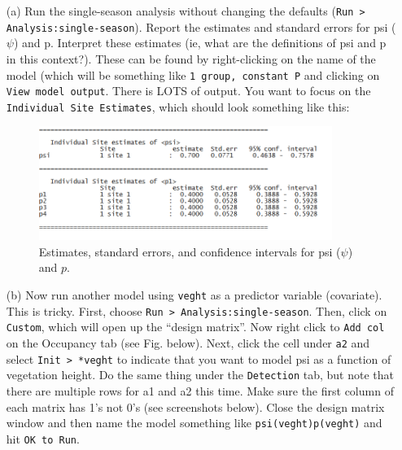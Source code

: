 \documentclass[12pt]{article}\usepackage[]{graphicx}\usepackage[]{color}
\begin{document}
\begin{enumerate}
  \item[(a)] Run the single-season analysis without changing the
    defaults (\texttt{Run > Analysis:single-season}). Report the
    estimates and standard errors for psi ($\psi$) and p. Interpret
    these estimates (ie, what are the definitions of psi and p in this
    context?). These can be found by right-clicking on the name of the
    model (which will be something like \texttt{1 group, constant P}
    and clicking on \texttt{View model output}.  There is LOTS of
    output. You want to focus on the \texttt{Individual Site
      Estimates}, which should look something like this: 

\begin{figure}[h!]
  \centering
  \includegraphics[width=0.9\textwidth]{figs/pres-est}
  \caption{\small Estimates, standard errors, and confidence intervals
  for psi ($\psi$) and $p$.}
  \label{fig:pres-est}
\end{figure}
    
  \item[(b)] Now run another model using \texttt{veght} as a
    predictor variable (covariate). This is tricky. First, choose 
    \texttt{Run > Analysis:single-season}. Then, click on
    \texttt{Custom}, which will open up the ``design matrix''. Now
    right click to \texttt{Add col} on the Occupancy tab (see
    Fig. below). Next, click the cell under \texttt{a2} and select 
    \texttt{Init > *veght} to indicate that you want to model psi
    as a function of vegetation height. Do the same thing under the
    \texttt{Detection} tab, but note that there are multiple rows for
    a1 and a2 this time. Make sure the first column of each matrix has
    1's not 0's (see screenshots below). Close the design matrix
    window and then name the model something like 
    \texttt{psi(veght)p(veght)} and hit \texttt{OK to Run}. 


\end{enumerate}
\end{document}
